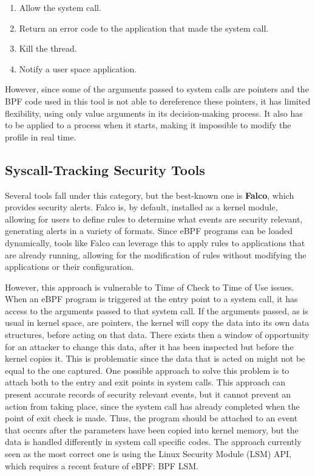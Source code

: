 \begin{enumerate}
    \item Allow the system call. 
    \item Return an error code to the application that made the system call. 
    \item Kill the thread. 
    \item Notify a user space application.
\end{enumerate}

However, since some of the arguments passed to system calls are pointers and the BPF code used in this tool is not able to dereference these pointers, it has limited flexibility, using only value arguments in its decision-making process. It also has to be applied to a process when it starts, making it impossible to modify the profile in real time. 

\subsection{Syscall-Tracking Security Tools}

Several tools fall under this category, but the best-known one is \textbf{Falco}, which provides security alerts. Falco is, by default, installed as a kernel module, allowing for users to define rules to determine what events are security relevant, generating alerts in a variety of formats. Since eBPF programs can be loaded dynamically, tools like Falco can leverage this to apply rules to applications that are already running, allowing for the modification of rules without modifying the applications or their configuration. 

However, this approach is vulnerable to Time of Check to Time of Use issues. 
When an eBPF program is triggered at the entry point to a system call, it has access to the arguments passed to that system call. If the arguments passed, as is usual in kernel space, are pointers, the kernel will copy the data into its own data structures, before acting on that data. There exists then a window of opportunity for an attacker to change this data, after it has been inspected but before the kernel copies it. This is problematic since the data that is acted on might not be equal to the one captured. One possible approach to solve this problem is to attach both to the entry and exit points in system calls. This approach can present accurate records of security relevant events, but it cannot prevent an action from taking place, since the system call has already completed when the point of exit check is made. Thus, the program should be attached to an event that occurs after the parameters have been copied into kernel memory, but the data is handled differently in system call specific codes. The approach currently seen as the most correct one is using the Linux Security Module (LSM) API, which requires a recent feature of eBPF: BPF LSM. 

